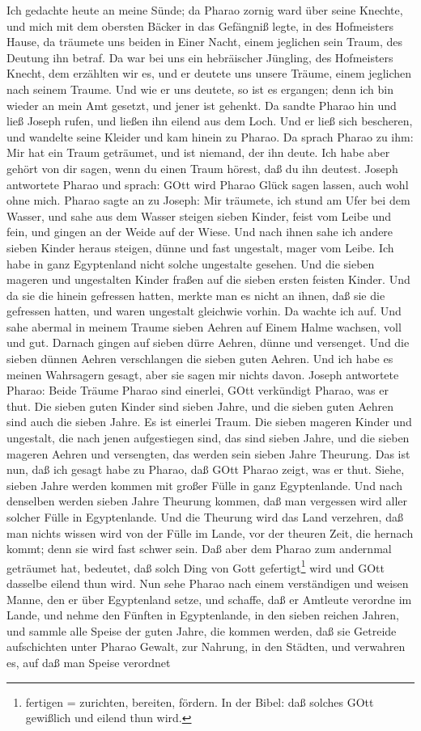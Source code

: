 \begin{schriftzitat}
Ich gedachte heute an meine Sünde; da Pharao zornig ward über seine Knechte, und mich mit dem obersten Bäcker in das Gefängniß legte, in des Hofmeisters Hause, da träumete uns beiden in Einer Nacht, einem jeglichen sein Traum, des Deutung ihn betraf. Da war bei uns ein hebräischer Jüngling, des Hofmeisters Knecht, dem erzählten wir es, und er deutete uns unsere Träume, einem jeglichen nach seinem Traume. Und wie er uns deutete, so ist es ergangen; denn ich bin wieder an mein Amt gesetzt, und jener ist gehenkt. Da sandte Pharao hin und ließ Joseph rufen, und ließen ihn eilend aus dem Loch. Und er ließ sich bescheren, und wandelte seine Kleider und kam hinein zu Pharao. Da sprach Pharao zu ihm: Mir hat ein Traum geträumet, und ist niemand, der ihn deute. Ich habe aber gehört von dir sagen, wenn du einen Traum hörest, daß du ihn deutest. Joseph antwortete Pharao und sprach: GOtt wird Pharao Glück sagen lassen, auch wohl ohne mich. Pharao sagte an zu Joseph: Mir träumete, ich stund am Ufer bei dem Wasser, und sahe aus dem Wasser steigen sieben Kinder, feist vom Leibe und fein, und gingen an der Weide auf der Wiese. Und nach ihnen sahe ich andere sieben Kinder heraus steigen, dünne und fast ungestalt, mager vom Leibe. Ich habe in ganz Egyptenland nicht solche ungestalte gesehen. Und die sieben mageren und ungestalten Kinder fraßen auf die sieben ersten feisten Kinder. Und da sie die hinein gefressen hatten, merkte man es nicht an ihnen, daß sie die gefressen hatten, und waren ungestalt gleichwie vorhin. Da wachte ich auf. Und sahe abermal in meinem Traume sieben Aehren auf Einem Halme wachsen, voll und gut. Darnach gingen auf sieben dürre Aehren, dünne und versenget. Und die sieben dünnen Aehren verschlangen die sieben guten Aehren. Und ich habe es meinen Wahrsagern gesagt, aber sie sagen mir nichts davon. Joseph antwortete Pharao: Beide Träume Pharao sind einerlei, GOtt verkündigt Pharao, was er thut. Die sieben guten Kinder sind sieben Jahre, und die sieben guten Aehren sind auch die sieben Jahre. Es ist einerlei Traum. Die sieben mageren Kinder und ungestalt, die nach jenen aufgestiegen sind, das sind sieben Jahre, und die sieben mageren Aehren und versengten, das werden sein sieben Jahre Theurung. Das ist nun, daß ich gesagt habe zu Pharao, daß GOtt Pharao zeigt, was er thut. Siehe, sieben Jahre werden kommen mit großer Fülle in ganz Egyptenlande. Und nach denselben werden sieben Jahre Theurung kommen, daß man vergessen wird aller solcher Fülle in Egyptenlande. Und die Theurung wird das Land verzehren, daß man nichts wissen wird von der Fülle im Lande, vor der theuren Zeit, die hernach kommt; denn sie wird fast schwer sein. Daß aber dem Pharao zum andernmal geträumet hat, bedeutet, daß solch Ding von Gott gefertigt\footnote{fertigen = zurichten, bereiten, fördern. In der Bibel: daß solches GOtt gewißlich und eilend thun wird.} wird und GOtt dasselbe eilend thun wird. Nun sehe Pharao nach einem verständigen und weisen Manne, den er über Egyptenland setze, und schaffe, daß er Amtleute verordne im Lande, und nehme den Fünften in Egyptenlande, in den sieben reichen Jahren, und sammle alle Speise der guten Jahre, die kommen werden, daß sie Getreide aufschichten unter Pharao Gewalt, zur Nahrung, in den Städten, und verwahren es, auf daß man Speise verordnet 
\end{schriftzitat}
